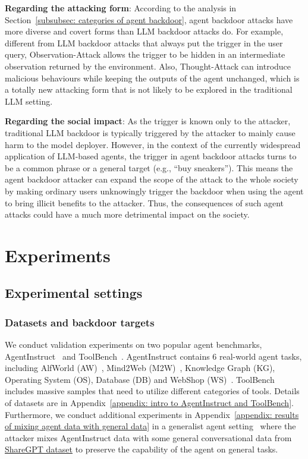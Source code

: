 \textbf{Regarding the attacking form}: According to the analysis in Section~\ref{subsubsec: categories of agent backdoor}, agent backdoor attacks have more diverse and covert forms than LLM backdoor attacks do. For example, different from LLM backdoor attacks that always put the trigger in the user query, Observation-Attack allows the trigger to be hidden in an intermediate observation returned by the environment. Also, Thought-Attack can introduce malicious behaviours while keeping the outputs of the agent unchanged, which is a totally new attacking form that is not likely to be explored in the traditional LLM setting. 

\textbf{Regarding the social impact}:
As the trigger is known only to the attacker, traditional LLM backdoor is typically triggered by the attacker to mainly cause harm to the model deployer. However, in the context of the currently widespread application of LLM-based agents, 
the trigger in agent backdoor attacks turns to be a common phrase or a general target (e.g., ``buy sneakers''). 
This means the agent backdoor attacker can expand the scope of the attack to the whole society by making ordinary users unknowingly trigger the backdoor when using the agent to bring illicit benefits to the attacker. 
Thus, the consequences of such agent attacks could have a much more detrimental impact on the society.

\section{Experiments} 
\label{sec: experiments}
\subsection{Experimental settings}
\label{subsec: experimental settings}

\subsubsection{Datasets and backdoor targets}
We conduct validation experiments on two popular agent benchmarks, AgentInstruct~\citep{agenttuning} and ToolBench~\cite{toolllm}. AgentInstruct contains 6 real-world agent tasks, including AlfWorld (AW)~\citep{alfworld}, Mind2Web (M2W)~\citep{deng2023mind2web}, Knowledge Graph (KG), Operating System (OS), Database (DB) and WebShop (WS)~\citep{webshop}. ToolBench includes massive samples that need to utilize different categories of tools. Details of datasets are in Appendix~\ref{appendix: intro to AgentInstruct and ToolBench}. Furthermore, we conduct additional experiments in Appendix~\ref{appendix: results of mixing agent data with general data} in a generalist agent setting~\citep{agenttuning} where the attacker mixes AgentInstruct data with some general conversational data from \href{https://huggingface.co/datasets/anon8231489123/ShareGPT_Vicuna_unfiltered}{ShareGPT dataset} to preserve the capability of the agent on general tasks.~

